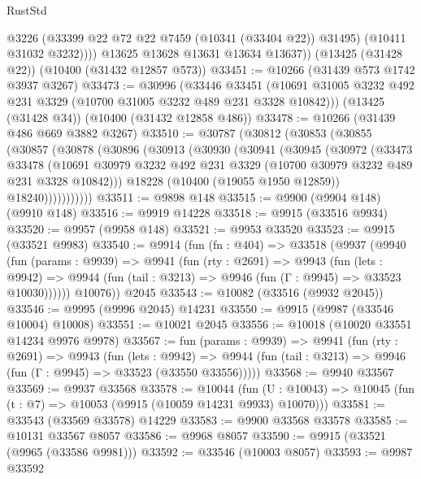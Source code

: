 \begin{lexlean}{RustStd}
\begin{coremodule}
{\begin{coremodule}
{{{{{{{{{{{{{{{{{{{{{{{{{              @3226
              (@33399 @22 @72 @22 @7459 (@10341 (@33404 @22)) @31495)
              (@10411 @31032 @3232))))
        @13625
        @13628
        @13631
        @13634
        @13637))
    (@13425 (@31428 @22))
    (@10400 (@31432 @12857 @573))
@33451 := @10266 (@31439 @573 @1742 @3937 @3267)
@33473 := @30996
    (@33446
      @33451
      (@10691 @31005 @3232 @492 @231 @3329 (@10700 @31005 @3232 @489 @231 @3328 @10842)))
    (@13425 (@31428 @34))
    (@10400 (@31432 @12858 @486))
@33478 := @10266 (@31439 @486 @669 @3882 @3267)
@33510 := @30787
    (@30812
      (@30853
        (@30855
          (@30857
            (@30878
              (@30896
                (@30913
                  (@30930
                    (@30941
                      (@30945
                        (@30972
                          (@33473
                            @33478
                            (@10691
                              @30979
                              @3232
                              @492
                              @231
                              @3329
                              (@10700 @30979 @3232 @489 @231 @3328 @10842)))
                          @18228
                          (@10400 (@19055 @1950 @12859))
                          @18240)))))))))))
@33511 := @9898 @148
@33515 := @9900 (@9904 @148) (@9910 @148)
@33516 := @9919 @14228
@33518 := @9915 (@33516 @9934)
@33520 := @9957 (@9958 @148)
@33521 := @9953 @33520
@33523 := @9915 (@33521 @9983)
@33540 := @9914
    (fun (fn : @404) =>
    @33518
      (@9937
        (@9940
          (fun (params : @9939) =>
          @9941
            (fun (rty : @2691) =>
            @9943
              (fun (lets : @9942) =>
              @9944 (fun (tail : @3213) => @9946 (fun (Γ : @9945) => @33523 @10030))))))
        @10076))
    @2045
@33543 := @10082 (@33516 (@9932 @2045))
@33546 := @9995 (@9996 @2045) @14231
@33550 := @9915 (@9987 (@33546 @10004) @10008)
@33551 := @10021 @2045
@33556 := @10018 (@10020 @33551 @14234 @9976 @9978)
@33567 := fun (params : @9939) =>
  @9941
    (fun (rty : @2691) =>
    @9943
      (fun (lets : @9942) =>
      @9944 (fun (tail : @3213) => @9946 (fun (Γ : @9945) => @33523 (@33550 @33556)))))
@33568 := @9940 @33567
@33569 := @9937 @33568
@33578 := @10044
    (fun (U : @10043) => @10045 (fun (t : @7) => @10053 (@9915 (@10059 @14231 @9933) @10070)))
@33581 := @33543 (@33569 @33578) @14229
@33583 := @9900 @33568 @33578
@33585 := @10131 @33567 @8057
@33586 := @9968 @8057
@33590 := @9915 (@33521 (@9965 (@33586 @9981)))
@33592 := @33546 (@10003 @8057)
@33593 := @9987 @33592
}}}}}}}}}}}}}}}}}}}}}}}}}
\end{coremodule}}
\end{coremodule}
\end{lexlean}
